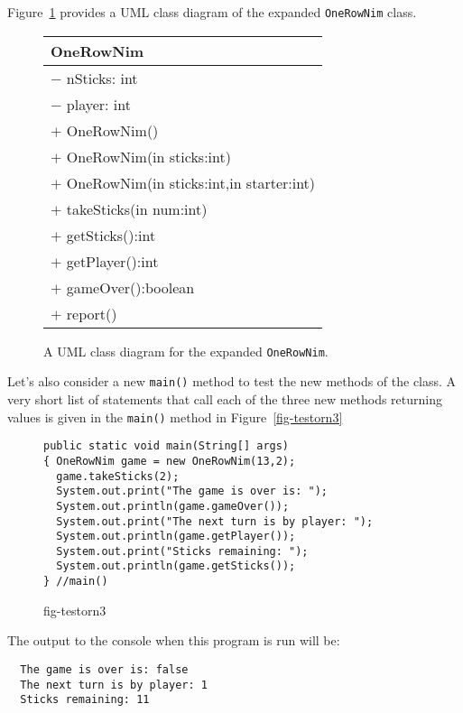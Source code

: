 \noindent Figure~\ref{fig-ornuml2} provides a UML class diagram of the 
expanded {\tt OneRowNim} class.
\begin{figure}[h!]
\begin{center}
\begin{tabular}{|l|} \hline
OneRowNim\\ \hline
$-$ nSticks: int  \\
$-$ player: int  \\ \hline
$+$ OneRowNim() \\
$+$ OneRowNim(in sticks:int) \\
$+$ OneRowNim(in sticks:int,in starter:int) \\
$+$ takeSticks(in num:int) \\
$+$ getSticks():int \\
$+$ getPlayer():int \\
$+$ gameOver():boolean \\
$+$ report()\\ \hline
\end{tabular}
\end{center}
\caption{A UML class diagram for the expanded {\tt OneRowNim}.}
\label{fig-ornuml2}
\end{figure}

Let's also consider a new {\tt main()} method to test the new methods
of the class.  A very short list of statements that call each of the
three new methods returning values is given in the {\tt main()} method
in Figure~\ref{fig-testorn3}
\begin{figure}[h!]
\jjjprogstart
\begin{jjjlisting}
\begin{lstlisting}
public static void main(String[] args) 
{ OneRowNim game = new OneRowNim(13,2);
  game.takeSticks(2);
  System.out.print("The game is over is: ");
  System.out.println(game.gameOver());
  System.out.print("The next turn is by player: ");
  System.out.println(game.getPlayer());
  System.out.print("Sticks remaining: ");
  System.out.println(game.getSticks());
} //main()
\end{lstlisting}
\end{jjjlisting}
{fig-testorn3}
\end{figure}

\noindent The output to the console  when this program is run will
be:

\begin{jjjlisting}
\begin{lstlisting}
  The game is over is: false
  The next turn is by player: 1
  Sticks remaining: 11
\end{lstlisting}
\end{jjjlisting}

